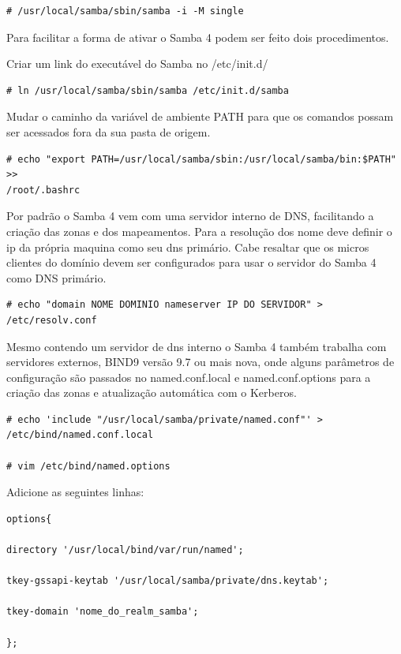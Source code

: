 \begin{lstlisting}
# /usr/local/samba/sbin/samba -i -M single
\end{lstlisting}

Para facilitar a forma de ativar o Samba 4 podem ser feito dois procedimentos.

Criar um link do executável do Samba no /etc/init.d/\\

\begin{lstlisting}
# ln /usr/local/samba/sbin/samba /etc/init.d/samba
\end{lstlisting}

Mudar o caminho da variável de ambiente PATH para que os comandos possam ser acessados fora da sua pasta de origem.\\

\begin{lstlisting}
# echo "export PATH=/usr/local/samba/sbin:/usr/local/samba/bin:$PATH" >> 
/root/.bashrc
\end{lstlisting}

Por padrão o Samba 4 vem com uma servidor interno de DNS, facilitando a criação das zonas e dos mapeamentos. Para a resolução dos nome deve definir o ip da própria maquina como seu dns primário. Cabe resaltar que os micros clientes do domínio devem ser configurados para usar o servidor do Samba 4 como DNS primário.\\

\begin{lstlisting}
# echo "domain NOME DOMINIO nameserver IP DO SERVIDOR" > /etc/resolv.conf
\end{lstlisting}

Mesmo contendo um servidor de dns interno o Samba 4 também trabalha com servidores externos, BIND9 versão 9.7 ou mais nova, onde alguns parâmetros de configuração são passados no named.conf.local e named.conf.options para a criação das zonas e atualização automática com o Kerberos.\\

\begin{lstlisting}
# echo 'include "/usr/local/samba/private/named.conf"' > 
/etc/bind/named.conf.local

# vim /etc/bind/named.options
\end{lstlisting}

Adicione as seguintes linhas:\\

\begin{lstlisting}
options{ 
	
directory '/usr/local/bind/var/run/named'; 

tkey-gssapi-keytab '/usr/local/samba/private/dns.keytab'; 

tkey-domain 'nome_do_realm_samba';
	
};
\end{lstlisting}

